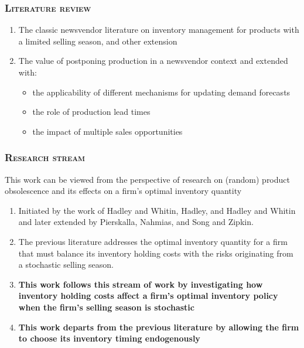 \documentclass[aspectratio=169]{../presentation}
\begin{document}
    \begin{frame}
        \frametitle{\textsc{Literature review}}

        \begin{enumerate}
            \item The classic newsvendor literature on inventory management for products with a limited selling season\cite{porteus1990}, and other extension
            \item The value of postponing production in a newsvendor context\cite{anupindi2008, iyer2003, ulku2005, van1999} and extended with:
            \begin{itemize}
                \item the applicability of different mechanisms for updating demand forecasts\cite{boyaci2010, oh2013, wang2012}
                \item the role of production lead times\cite{wang2009}
                \item the impact of multiple sales opportunities\cite{song2012}
            \end{itemize}
        \end{enumerate}

    \end{frame}

    \begin{frame}
        \frametitle{\textsc{Research stream}}

        This work can be viewed from the perspective of research on (random) product obsolescence and its effects on a firm's optimal inventory quantity

        \begin{enumerate}
            \item Initiated by the work of Hadley and Whitin\cite{hadley1961}, Hadley\cite{hadley1962}, and Hadley and Whitin\cite{hadley1962family} and later extended by Pierskalla\cite{pierskalla1969}, Nahmias\cite{nahmias1977, nahmias1982}, and Song and Zipkin\cite{song1996}.
            \item The previous literature addresses the optimal inventory quantity for a firm that must balance its inventory holding costs with the risks originating from a stochastic selling season.
            \item \textbf{This work follows this stream of work by investigating how inventory holding costs affect a firm's optimal inventory policy when the firm's selling season is stochastic}
            \item \textbf{This work departs from the previous literature by allowing the firm to choose its inventory timing endogenously}
        \end{enumerate}


    \end{frame}
\end{document}
